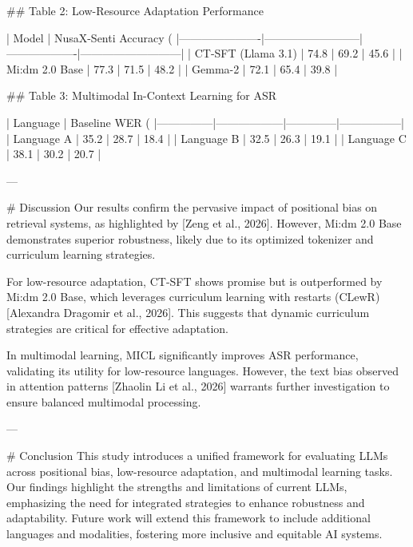 ## Table 2: Low-Resource Adaptation Performance  

| Model                | NusaX-Senti Accuracy (%
|----------------------|--------------------------|-------------------|---------------------------|  
| CT-SFT (Llama 3.1)   | 74.8                    | 69.2              | 45.6                      |  
| Mi:dm 2.0 Base       | 77.3                    | 71.5              | 48.2                      |  
| Gemma-2              | 72.1                    | 65.4              | 39.8                      |  

## Table 3: Multimodal In-Context Learning for ASR  

| Language      | Baseline WER (%
|---------------|------------------|--------------|-----------------|  
| Language A    | 35.2             | 28.7         | 18.4            |  
| Language B    | 32.5             | 26.3         | 19.1            |  
| Language C    | 38.1             | 30.2         | 20.7            |  

---

# Discussion  
Our results confirm the pervasive impact of positional bias on retrieval systems, as highlighted by [Zeng et al., 2026]. However, Mi:dm 2.0 Base demonstrates superior robustness, likely due to its optimized tokenizer and curriculum learning strategies.  

For low-resource adaptation, CT-SFT shows promise but is outperformed by Mi:dm 2.0 Base, which leverages curriculum learning with restarts (CLewR) [Alexandra Dragomir et al., 2026]. This suggests that dynamic curriculum strategies are critical for effective adaptation.  

In multimodal learning, MICL significantly improves ASR performance, validating its utility for low-resource languages. However, the text bias observed in attention patterns [Zhaolin Li et al., 2026] warrants further investigation to ensure balanced multimodal processing.  

---

# Conclusion  
This study introduces a unified framework for evaluating LLMs across positional bias, low-resource adaptation, and multimodal learning tasks. Our findings highlight the strengths and limitations of current LLMs, emphasizing the need for integrated strategies to enhance robustness and adaptability. Future work will extend this framework to include additional languages and modalities, fostering more inclusive and equitable AI systems.  

